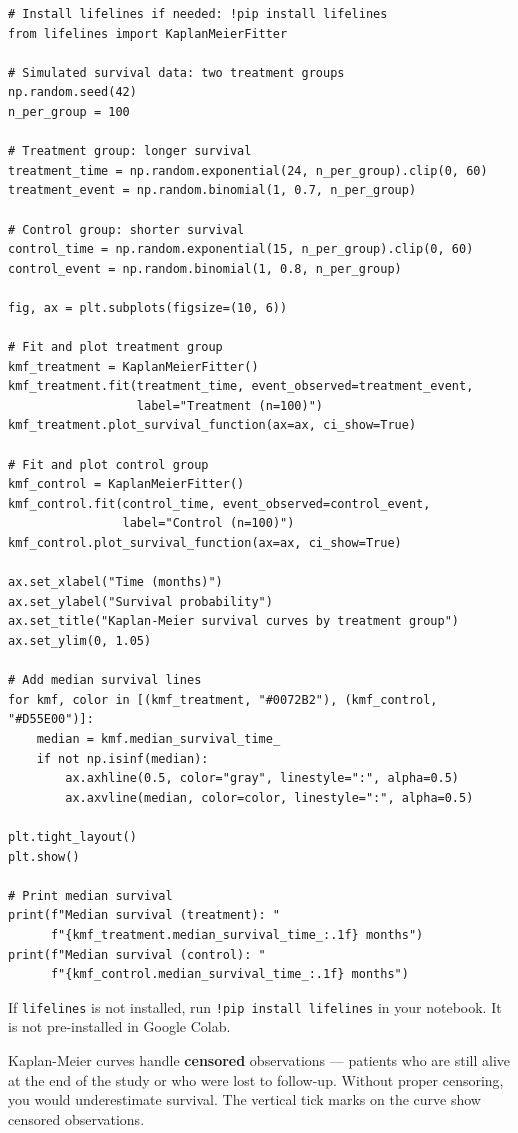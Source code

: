 \begin{verbatim}
# Install lifelines if needed: !pip install lifelines
from lifelines import KaplanMeierFitter

# Simulated survival data: two treatment groups
np.random.seed(42)
n_per_group = 100

# Treatment group: longer survival
treatment_time = np.random.exponential(24, n_per_group).clip(0, 60)
treatment_event = np.random.binomial(1, 0.7, n_per_group)

# Control group: shorter survival
control_time = np.random.exponential(15, n_per_group).clip(0, 60)
control_event = np.random.binomial(1, 0.8, n_per_group)

fig, ax = plt.subplots(figsize=(10, 6))

# Fit and plot treatment group
kmf_treatment = KaplanMeierFitter()
kmf_treatment.fit(treatment_time, event_observed=treatment_event,
                  label="Treatment (n=100)")
kmf_treatment.plot_survival_function(ax=ax, ci_show=True)

# Fit and plot control group
kmf_control = KaplanMeierFitter()
kmf_control.fit(control_time, event_observed=control_event,
                label="Control (n=100)")
kmf_control.plot_survival_function(ax=ax, ci_show=True)

ax.set_xlabel("Time (months)")
ax.set_ylabel("Survival probability")
ax.set_title("Kaplan-Meier survival curves by treatment group")
ax.set_ylim(0, 1.05)

# Add median survival lines
for kmf, color in [(kmf_treatment, "#0072B2"), (kmf_control, "#D55E00")]:
    median = kmf.median_survival_time_
    if not np.isinf(median):
        ax.axhline(0.5, color="gray", linestyle=":", alpha=0.5)
        ax.axvline(median, color=color, linestyle=":", alpha=0.5)

plt.tight_layout()
plt.show()

# Print median survival
print(f"Median survival (treatment): "
      f"{kmf_treatment.median_survival_time_:.1f} months")
print(f"Median survival (control): "
      f"{kmf_control.median_survival_time_:.1f} months")
\end{verbatim}

\begin{warningbox}
If \texttt{lifelines} is not installed, run \texttt{!pip install lifelines} in your notebook. It is not pre-installed in Google Colab.
\end{warningbox}

\begin{clinicalnote}
Kaplan-Meier curves handle \textbf{censored} observations --- patients who are still alive at the end of the study or who were lost to follow-up. Without proper censoring, you would underestimate survival. The vertical tick marks on the curve show censored observations.
\end{clinicalnote}

